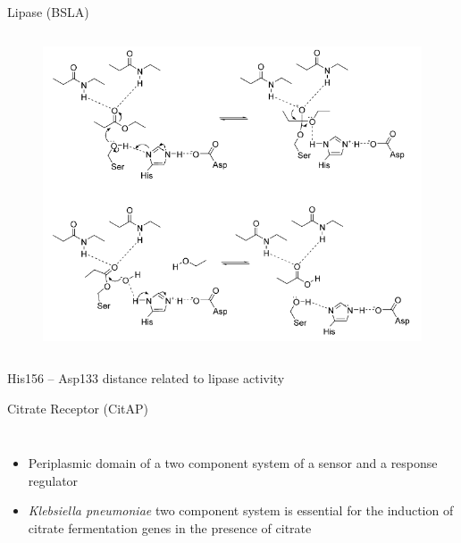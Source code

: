 \documentclass{beamer}
\begin{document}
\begin{frame}[t]
\begin{columns}[T,onlytextwidth]
\begin{column}[T]{.48\linewidth}
{\begin{block}{Lipase (BSLA)}
\begin{columns}[t]
                \begin{figure}
                    \includegraphics[width=1.0\textwidth]{figures/BSLA_reaction.png}
                \end{figure}     

            \end{columns} 

            \centering
            His156 -- Asp133 distance related to lipase activity 

        \end{block}


        \vspace*{1.0ex}

        \vfill

        \begin{block}{Citrate Receptor (CitAP)} 

            \begin{columns}[t]
                \begin{itemize}
                    \item Periplasmic domain of a two component system of a sensor and a response regulator
                    \item \textit{Klebsiella pneumoniae} two component system is essential for the induction of citrate fermentation genes in the presence of citrate
                \end{itemize} 


\end{columns}
\end{block}}
\end{column}
\end{columns}
\end{frame}
\end{document}

